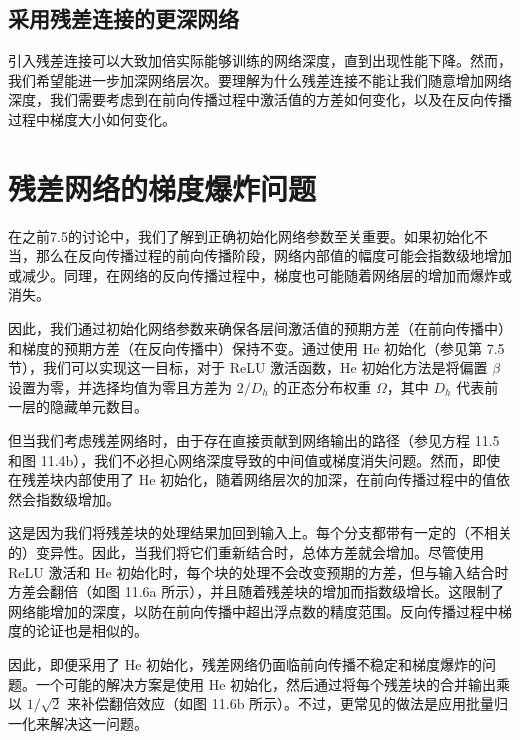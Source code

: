 \subsection{采用残差连接的更深网络}
引入残差连接可以大致加倍实际能够训练的网络深度，直到出现性能下降。然而，我们希望能进一步加深网络层次。要理解为什么残差连接不能让我们随意增加网络深度，我们需要考虑到在前向传播过程中激活值的方差如何变化，以及在反向传播过程中梯度大小如何变化。

\section{残差网络的梯度爆炸问题}
在之前7.5的讨论中，我们了解到正确初始化网络参数至关重要。如果初始化不当，那么在反向传播过程的前向传播阶段，网络内部值的幅度可能会指数级地增加或减少。同理，在网络的反向传播过程中，梯度也可能随着网络层的增加而爆炸或消失。

因此，我们通过初始化网络参数来确保各层间激活值的预期方差（在前向传播中）和梯度的预期方差（在反向传播中）保持不变。通过使用 He 初始化（参见第 7.5 节），我们可以实现这一目标，对于 ReLU 激活函数，He 初始化方法是将偏置 \(\beta\) 设置为零，并选择均值为零且方差为 \(2/D_h\) 的正态分布权重 \(\Omega\)，其中 \(D_h\) 代表前一层的隐藏单元数目。

但当我们考虑残差网络时，由于存在直接贡献到网络输出的路径（参见方程 11.5 和图 11.4b），我们不必担心网络深度导致的中间值或梯度消失问题。然而，即使在残差块内部使用了 He 初始化，随着网络层次的加深，在前向传播过程中的值依然会指数级增加。

这是因为我们将残差块的处理结果加回到输入上。每个分支都带有一定的（不相关的）变异性。因此，当我们将它们重新结合时，总体方差就会增加。尽管使用 ReLU 激活和 He 初始化时，每个块的处理不会改变预期的方差，但与输入结合时方差会翻倍（如图 11.6a 所示），并且随着残差块的增加而指数级增长。这限制了网络能增加的深度，以防在前向传播中超出浮点数的精度范围。反向传播过程中梯度的论证也是相似的。

因此，即便采用了 He 初始化，残差网络仍面临前向传播不稳定和梯度爆炸的问题。一个可能的解决方案是使用 He 初始化，然后通过将每个残差块的合并输出乘以 \(1/\sqrt{2}\) 来补偿翻倍效应（如图 11.6b 所示）。不过，更常见的做法是应用批量归一化来解决这一问题。

